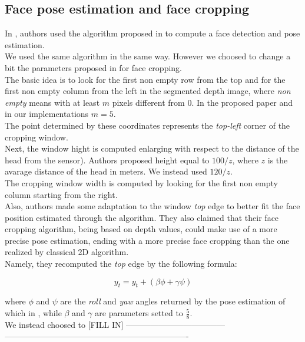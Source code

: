 \documentclass[twoside,twocolumn]{article}
\begin{document}
\subsection{Face pose estimation and face cropping}
In \citep{Hayat2016}, authors used the algorithm proposed in \citep{Fanelli2011}
to compute a face detection and pose estimation.
\\
We used the same algorithm in the same way. However we choosed to change a bit
the parameters proposed in \citep{Hayat2016} for face cropping.
\\
The basic idea is to look for the first non empty row from the top and for the
first non empty column from the left in the segmented depth image, where
\textit{non empty} means with at least $m$ pixels different from $0$. In the
proposed paper and in our implementations $m = 5$.
\\
The point determined by these coordinates represents the \textit{top-left}
corner of the cropping window.
\\
Next, the window hight is computed enlarging with respect to the distance of
the head from the sensor). Authors proposed height equal to $100/z$, where $z$
is the avarage distance of the head in meters. We instead used $120/z$.
\\
The cropping window width is computed by looking for the first non empty column
starting from the right.
\\
Also, authors made some adaptation to the window \textit{top} edge to better
fit the face position estimated through the algorithm. They also claimed that
their face cropping algorithm, being based on depth values, could make use of a
more precise pose estimation, ending with a more precise face cropping than the
one realized by classical 2D algorithm.
\\
Namely, they recomputed the \textit{top} edge by the following formula:

$$y_t = y_t + (\beta \phi +\gamma \psi)$$

where $\phi$ and $\psi$ are the \textit{roll} and \textit{yaw} angles returned
by the pose estimation of which in \citep{Fanelli2011}, while $\beta$ and
$\gamma$ are parameters setted to $\frac{5}{8}$.
\\
We instead choosed to [FILL IN] ------------------------------------
-------------------------------------------------------------------
\\
\end{document}

